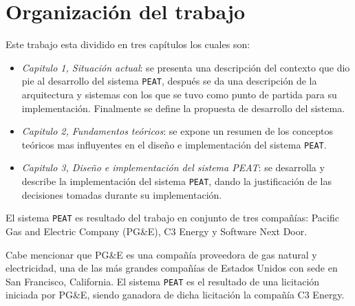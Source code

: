 \section*{Organización del trabajo}

Este trabajo esta dividido en tres capítulos los cuales son:
\begin{itemize}
\item \textit{Capitulo 1, Situación actual}: se presenta una descripción del contexto
  que dio pie al desarrollo del sistema \texttt{PEAT}, después se da una
  descripción de la arquitectura y sistemas con los que se tuvo como punto de
  partida para su implementación. Finalmente se define la propuesta de desarrollo
  del sistema.
\item \textit{Capitulo 2, Fundamentos teóricos}: se expone un resumen de los
  conceptos teóricos mas influyentes en el diseño e implementación del
  sistema \texttt{PEAT}.
\item \textit{Capitulo 3, Diseño e implementación del sistema PEAT}: se desarrolla y
  describe la implementación del sistema \texttt{PEAT}, dando la justificación
  de las decisiones tomadas durante su implementación.
\end{itemize}

El sistema \texttt{PEAT} es resultado del trabajo en conjunto de tres compañías:
Pacific Gas and Electric Company (PG\&E), C3 Energy y Software Next Door.

Cabe mencionar que PG\&E es una compañía proveedora de gas natural y electricidad, una de las
más grandes compañías de Estados Unidos con sede en San Francisco, California.
El sistema \texttt{PEAT} es el resultado de una licitación iniciada por PG\&E,
siendo ganadora de dicha licitación la compañía C3 Energy.
